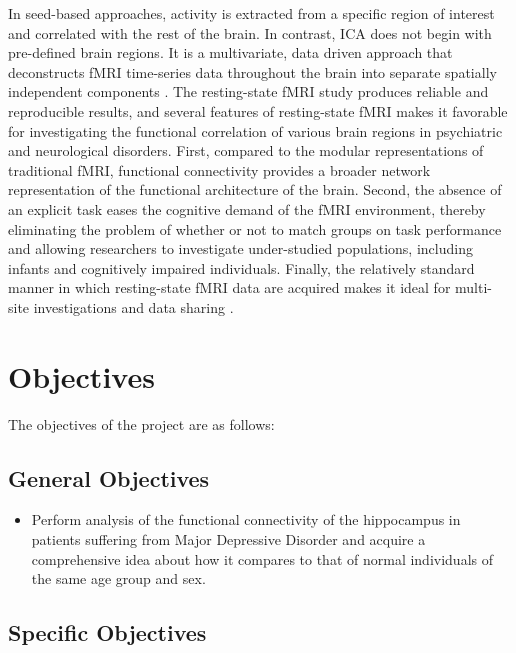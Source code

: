 \documentclass[12pt]{article}
\begin{document}
In seed-based approaches, activity is extracted from a specific region
of interest and correlated with the rest of the brain. In contrast,
ICA does not begin with pre-defined brain regions. It is
a multivariate, data driven approach that deconstructs fMRI
time-series data throughout the brain into separate spatially
independent components \cite{connectivityanalysis}. The resting-state
fMRI study produces reliable and reproducible results, and several
features of resting-state fMRI makes it favorable for investigating
the functional correlation of various brain regions in psychiatric and
neurological disorders. First, compared to the modular representations
of traditional fMRI, functional connectivity provides a broader
network representation of the functional architecture of the
brain. Second, the absence of an explicit task eases the cognitive
demand of the fMRI environment, thereby eliminating the problem of
whether or not to match groups on task performance and allowing
researchers to investigate under-studied populations, including
infants and cognitively impaired individuals. Finally, the relatively
standard manner in which resting-state fMRI data are acquired makes it
ideal for multi-site investigations and data sharing \cite{resting}.

\newpage

\section{Objectives}

The objectives of the project are as follows:

\subsection{General Objectives}

\begin{itemize}

  \item Perform analysis of the functional connectivity of the
    hippocampus in patients suffering from Major Depressive Disorder
    and acquire a comprehensive idea about how it compares to that of
    normal individuals of the same age group and sex.

\end{itemize}

\subsection{Specific Objectives}
\end{document}
